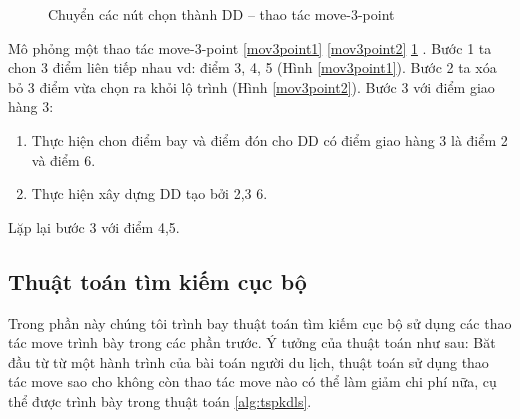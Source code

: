 \documentclass[a4paper,12pt]{report}
\begin{document}
\begin{figure}[H]

\caption{Chuyển các nút chọn thành DD -- thao tác move-3-point}\label{mov3point3}
\end{figure}

Mô phỏng một thao tác move-3-point \ref{mov3point1} \ref{mov3point2} \ref{mov3point3} . Bước 1 ta chon 3 điểm liên tiếp nhau vd:  điểm 3, 4, 5 (Hình \ref{mov3point1}). Bước 2 ta xóa bỏ 3 điểm vừa chọn ra khỏi lộ trình (Hình \ref{mov3point2}). Bước 3 với điểm giao hàng 3:\begin{enumerate}
\item Thực hiện chon điểm bay và điểm đón cho DD có điểm giao hàng 3 là điểm 2 và điểm 6.
\item Thực hiện xây dựng DD tạo bởi 2,3 6.
\end{enumerate} 
Lặp lại bước 3 với điểm 4,5.
\subsection{Thuật toán tìm kiếm cục bộ}
Trong phần này chúng tôi trình bay thuật toán tìm kiếm cục bộ sử dụng các thao tác move trình bày trong các phần trước. Ý tưởng của thuật toán như sau: Băt đầu từ từ một hành trình của bài toán người du lịch, thuật toán sử dụng thao tác move sao cho không còn thao tác move nào có thể làm giảm chi phí nữa, cụ thể được trình bày trong thuật toán \ref{alg:tspkdls}.
\end{document}
